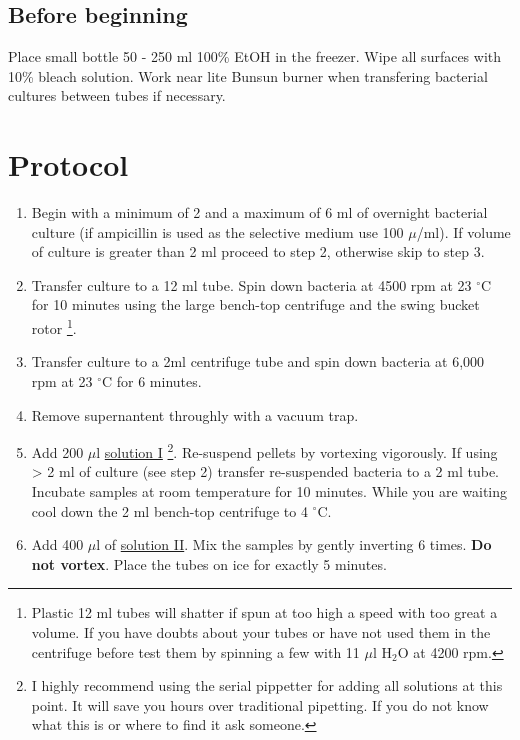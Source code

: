 \documentclass[12pt]{article}
\theoremstyle{definition}
\begin{document}
\subsection*{Before beginning}

Place small bottle 50 - 250 ml 100\% EtOH in the freezer. Wipe all surfaces with 10\% bleach solution. Work near lite Bunsun burner when transfering bacterial cultures between tubes if necessary.



\section*{Protocol}


\begin{enumerate}
	\item Begin with a minimum of 2 and a maximum of 6 ml of overnight bacterial culture (if ampicillin is used as the selective medium use 100 $\mu$/ml). If volume of culture is greater than 2 ml proceed to step 2, otherwise skip to step 3.
	
	\item Transfer culture to a 12 ml tube. Spin down bacteria at 4500 rpm at 23 $^{\circ}$C for 10 minutes using the large bench-top centrifuge and the swing bucket rotor \footnote{Plastic 12 ml tubes will shatter if spun at too high a speed with too great a volume. If you have doubts about your tubes or have not used them in the centrifuge before test them by spinning a few with 11 $\mu$l H$_{2}$O at 4200 rpm.}.
	
	\item Transfer culture to a 2ml centrifuge tube and spin down bacteria at 6,000 rpm at 23 $^{\circ}$C for 6 minutes.
	
	\item Remove supernantent throughly with a vacuum trap.
	
	\item Add 200 $\mu$l \hyperref[sec:sol-1]{solution I} \footnote{I highly recommend using the serial pippetter for adding all solutions at this point. It will save you hours over traditional pipetting. If you do not know what this is or where to find it ask someone.}. 
	Re-suspend pellets by vortexing vigorously. If using > 2 ml of culture (see step 2) transfer
	re-suspended bacteria to a 2 ml tube. Incubate samples at room temperature for 10 minutes. While you are waiting cool down the 2 ml bench-top centrifuge to 4  $^{\circ}$C.
	
	\item Add 400 $\mu$l of \hyperref[sec:sol-2]{solution II}. Mix the samples by gently
	inverting 6 times. \textbf{Do not vortex}. Place the tubes on ice for exactly 5 minutes.
	

\end{enumerate}
\end{document}

